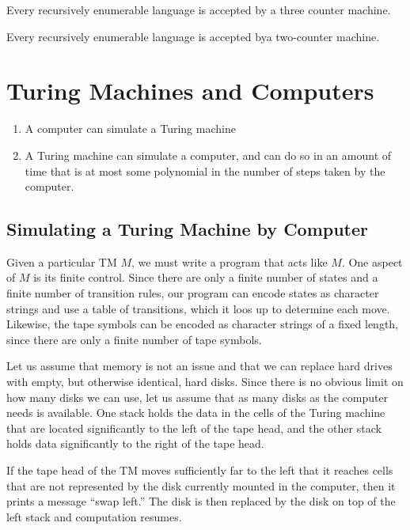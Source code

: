 \documentclass[]{article}
\begin{document}
\begin{thm}
Every recursively enumerable language is accepted by a three counter machine.
\end{thm}

\begin{thm}
Every recursively enumerable language is accepted bya  two-counter machine.
\end{thm}

\section*{Turing Machines and Computers}
\begin{enumerate}
\item A computer can simulate a Turing machine
\item A Turing machine can simulate a computer, and can do so in an amount of
time that is at most some polynomial in the number of steps taken by the
computer.
\end{enumerate}

\subsection*{Simulating a Turing Machine by Computer}
Given a particular TM $M$, we must write a program that acts like $M$. One
aspect of $M$ is its finite control. Since there are only a finite number of
states and a finite number of transition rules, our program can encode states as
character strings and use a table of transitions, which it loos up to determine
each move. Likewise, the tape symbols can be encoded as character strings of a
fixed length, since there are only a finite number of tape symbols.

Let us assume that memory is not an issue and that we can replace hard drives
with empty, but otherwise identical, hard disks. Since there is no obvious limit
on how many disks we can use, let us assume that as many disks as the computer
needs is available. One stack holds the data in the cells of the Turing machine
that are located significantly to the left of the tape head, and the other stack
holds data significantly to the right of the tape head.

If the tape head of the TM moves sufficiently far to the left that it reaches
cells that are not represented by the disk currently mounted in the computer,
then it prints a message ``swap left.'' The disk is then replaced by the disk on
top of the left stack and computation resumes.
\end{document}

